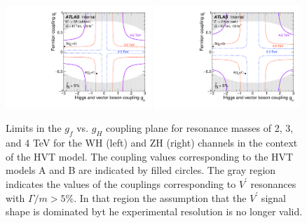 \begin{figure}[htbp!]
    \begin{center}
        \includegraphics[width=0.49\textwidth]{HVT_coupling_WH.pdf}
        \includegraphics[width=0.49\textwidth]{HVT_coupling_ZH.pdf}
    \end{center}
    \caption{
        Limits in the $g_f$ vs. $g_H$ coupling plane for resonance masses of 2, 3, and 4 TeV for the WH (left) and ZH (right) channels in the context of the HVT model.
        The coupling values corresponding to the HVT models A and B are indicated by filled circles.
        The gray region indicates the values of the couplings corresponding to $V^\prime$ resonances with $\Gamma / m > 5\%$. In that region the assumption that the $V^\prime$ signal \mjj shape is dominated byt he experimental resolution is no longer valid.
    }
    \label{fig:hvt_coupling_plane}
\end{figure}

